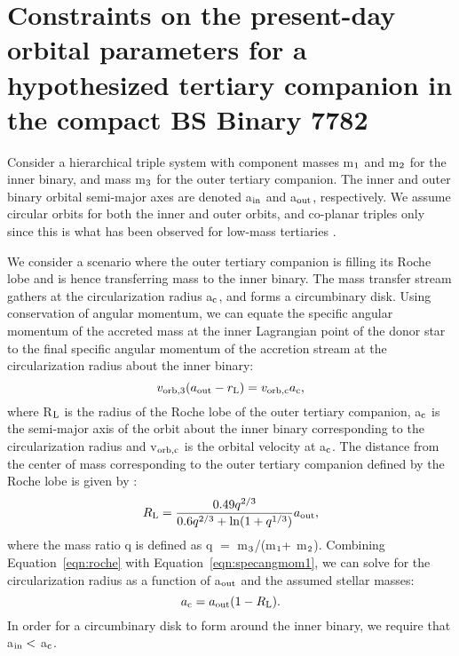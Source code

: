 \documentclass{aastex62}
\begin{document}
\section{Constraints on the present-day orbital parameters for a hypothesized tertiary companion in the compact BS Binary 7782} \label{dyn}

Consider a hierarchical triple system with component masses m$_{\rm 1}$ and m$_{\rm 2}$ for the inner binary, and mass m$_{\rm 3}$ for the outer tertiary companion.  The inner and outer binary orbital semi-major axes are denoted a$_{\rm in}$ and a$_{\rm out}$, respectively.  We assume circular orbits for both the inner and outer orbits, and co-planar triples only since this is what has been observed for low-mass tertiaries \citep[e.g.][]{moe18,tobin18}.  

We consider a scenario where the outer tertiary companion is filling its Roche lobe and is hence transferring mass to the inner binary.  The mass transfer stream gathers at the circularization radius a$_{\rm c}$, and forms a circumbinary disk.  Using conservation of angular momentum, we can equate the specific angular momentum of the accreted mass at the inner Lagrangian point of the donor star to the final specific angular momentum of the accretion stream at the circularization radius about the inner binary:
\begin{equation}
\label{eqn:specangmom1}
v_{\rm orb,3}(a_{\rm out} - r_{\rm L}) = v_{\rm orb,c}a_{\rm c},
\end{equation}
where R$_{\rm L}$ is the radius of the Roche lobe of the outer tertiary companion, a$_{\rm c}$ is the semi-major axis of the orbit about the inner binary corresponding to the circularization radius and v$_{\rm orb,c}$ is the orbital velocity at a$_{\rm c}$.  The distance from the center of mass corresponding to the outer tertiary companion defined by the Roche lobe is given by \citep{eggleton83}: 
\begin{equation}
\label{eqn:roche}
R_{\rm L} = \frac{0.49q^{2/3}}{0.6q^{2/3} + {\rm ln}(1 + q^{1/3})}a_{\rm out},
\end{equation}
where the mass ratio q is defined as q $=$ m$_{\rm 3}$/(m$_{\rm 1} +$ m$_{\rm 2}$).  Combining Equation~\ref{eqn:roche} with Equation~\ref{eqn:specangmom1}, we can solve for the circularization radius as a function of a$_{\rm out}$ and the assumed stellar masses:
\begin{equation}
\label{eqn:ac}
a_{\rm c} = a_{\rm out}(1 - R_{\rm L}).
\end{equation}
In order for a circumbinary disk to form around the inner binary, we require that a$_{\rm in} <$ a$_{\rm c}$.
\end{document}
